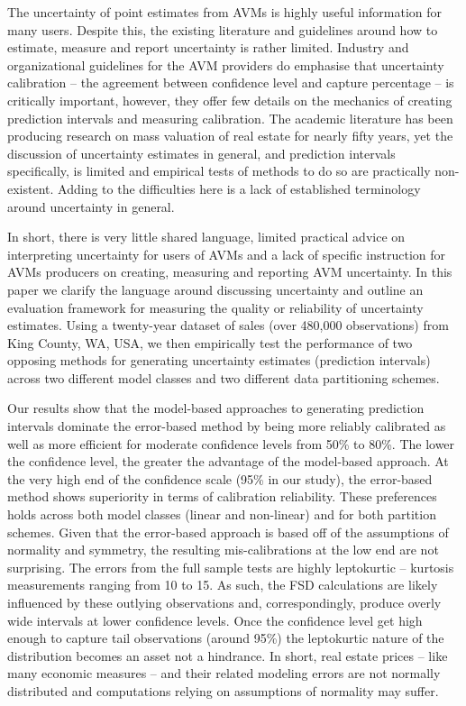 \documentclass[colTwo]{anon}
\theoremstyle{definition}
\begin{document}
The uncertainty of point estimates from AVMs is highly useful information for many users. Despite this, the existing literature and guidelines around how to estimate, measure and report uncertainty is rather limited.  Industry and organizational guidelines for the AVM providers do emphasise that uncertainty calibration -- the agreement between confidence level and capture percentage -- is critically important, however, they offer few details on the mechanics of creating prediction intervals and measuring calibration. The academic literature has been producing research on mass valuation of real estate for nearly fifty years, yet the discussion of uncertainty estimates in general, and prediction intervals specifically, is limited and empirical tests of methods to do so are practically non-existent.  Adding to the difficulties here is a lack of established terminology around uncertainty in general.

In short, there is very little shared language, limited practical advice on interpreting uncertainty for users of AVMs  and a lack of specific instruction for AVMs producers on creating, measuring and reporting AVM uncertainty. In this paper we clarify the language around discussing uncertainty and outline an evaluation framework for measuring the quality or reliability of uncertainty estimates.  Using a twenty-year dataset of sales (over 480,000 observations) from King County, WA, USA, we then empirically test the performance of two opposing methods for generating uncertainty estimates (prediction intervals) across two different model classes and two different data partitioning schemes.

Our results show that the model-based approaches to generating prediction intervals dominate the error-based method by being more reliably calibrated as well as more efficient for moderate confidence levels from 50\% to 80\%.  The lower the confidence level, the greater the advantage of the model-based approach. At the very high end of the confidence scale (95\% in our study), the error-based method shows superiority in terms of calibration reliability. These preferences holds across both model classes (linear and non-linear) and for both partition schemes.  Given that the error-based approach is based off of the assumptions of normality and symmetry, the resulting mis-calibrations at the low end are not surprising.  The errors from the full sample tests are highly leptokurtic -- kurtosis measurements ranging from 10 to 15. As such, the FSD calculations are likely influenced by these outlying observations and, correspondingly, produce overly wide intervals at lower confidence levels. Once the confidence level get high enough to capture tail observations (around 95\%) the leptokurtic nature of the distribution becomes an asset not a hindrance.  In short, real estate prices -- like many economic measures -- and their related modeling errors are not normally distributed and computations relying on assumptions of normality may suffer.
\end{document}
